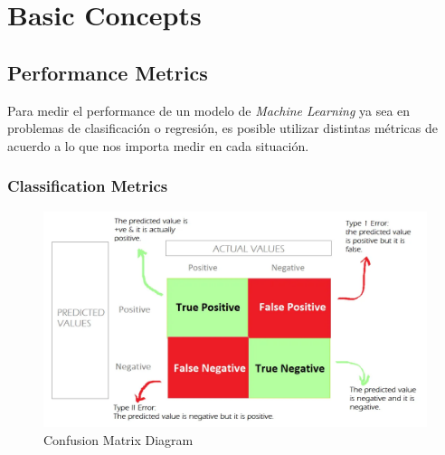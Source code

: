 \chapter{Basic Concepts}

\section{Performance Metrics} 

Para medir el performance de un modelo de \textit{Machine Learning} ya sea en problemas de clasificación o regresión, es posible utilizar distintas métricas de acuerdo a lo que nos importa medir en cada situación. 

\subsection{Classification Metrics}

\begin{figure}[H]
    \center
    \includegraphics[scale=0.25]{notebooks/Basic/img/confusion_matrix_diagram.png}
    \caption{Confusion Matrix Diagram}
\end{figure}

